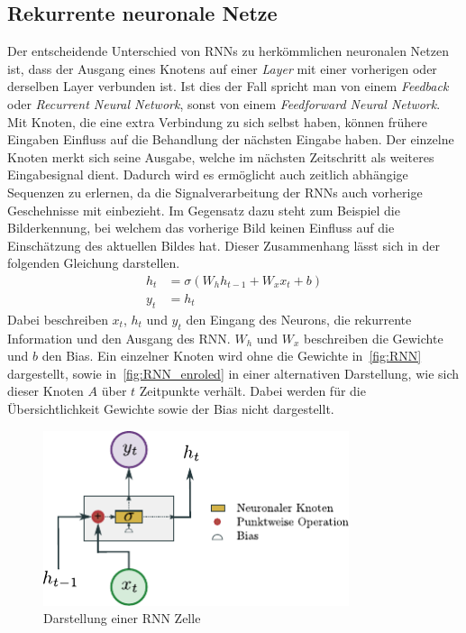         \subsection{Rekurrente neuronale Netze}\label{sec:RNN}
            Der entscheidende Unterschied von RNNs zu herkömmlichen neuronalen Netzen ist,
            dass der Ausgang eines Knotens auf einer \textit{Layer}  mit einer vorherigen oder derselben Layer verbunden ist.
            Ist dies der Fall spricht man von einem \textit{Feedback} oder \textit{Recurrent Neural Network}, sonst von einem \textit{Feedforward Neural Network}. 
            Mit Knoten, die eine extra Verbindung zu sich selbst haben, können frühere Eingaben Einfluss auf die Behandlung der nächsten Eingabe haben.
            Der einzelne Knoten merkt sich seine Ausgabe, welche im nächsten Zeitschritt als weiteres Eingabesignal dient.
            Dadurch wird es ermöglicht auch zeitlich abhängige Sequenzen zu erlernen, da die Signalverarbeitung der RNNs auch vorherige Geschehnisse mit einbezieht.
            Im Gegensatz dazu steht zum Beispiel die Bilderkennung, bei welchem das vorherige Bild keinen Einfluss auf die Einschätzung des aktuellen Bildes hat.
            Dieser Zusammenhang lässt sich in der folgenden Gleichung darstellen.
            \begin{equation}
                \begin{split}
                    h_t &= \sigma \left(W_{h}h_{t-1} + W_{x}x_{t} + b\right)\\
                    y_t &= h_t
                \end{split}
            \end{equation}
            Dabei beschreiben $x_t$, $h_t$ und $y_t$ den Eingang des Neurons, die rekurrente Information und den Ausgang des RNN\@.
            $W_h$ und  $W_x$ beschreiben die Gewichte und $b$ den Bias.
            Ein einzelner Knoten wird ohne die Gewichte in~\autoref{fig:RNN} dargestellt,
            sowie in~\autoref{fig:RNN_enroled} in einer alternativen Darstellung, wie sich dieser Knoten $A$ über $t$ Zeitpunkte verhält.
            Dabei werden für die Übersichtlichkeit Gewichte sowie der Bias nicht dargestellt.
                \begin{figure}[ht]
                    \centering
                    \includegraphics[width=0.8\textwidth]{images/Illustrationen/RNN_simple}
                    \caption{Darstellung einer RNN Zelle}
                    \label{fig:RNN}
                \end{figure}
